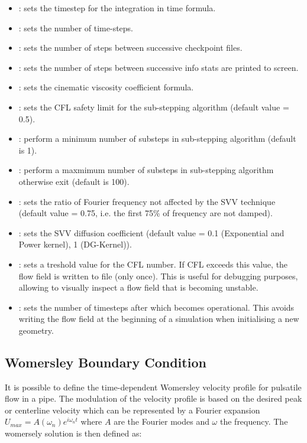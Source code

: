 \begin{itemize}
\item {}: sets the timestep for the integration in time formula.
\item {}: sets the number of time-steps.
\item {}: sets the number of steps between successive checkpoint files.
\item {}: sets the number of steps between successive info stats are printed to screen.
\item {}: sets the cinematic viscosity coefficient formula.
\item {}: sets the CFL safety limit for the sub-stepping algorithm (default value = 0.5).
\item {}: perform a minimum number of substeps in sub-stepping algorithm (default is 1).
\item {}: perform a maxmimum  number of substeps in sub-stepping algorithm otherwise exit (default is 100).
\item {}: sets the ratio of Fourier frequency not affected by the SVV technique (default value = 0.75, i.e. the first 75\% of frequency are not damped).
\item {}: sets the SVV diffusion coefficient (default value = 0.1 (Exponential and Power kernel), 1 (DG-Kernel)).
\item {}: sets a treshold value for the CFL number. If CFL exceeds this value, the flow field is written to file (only once). This is useful for debugging purposes, allowing to visually inspect a flow field that is becoming unstable.
\item {}: sets the number of timesteps after which  becomes operational. This avoids writing the flow field at the beginning of a simulation when initialising a new geometry.
\end{itemize}

\subsection{Womersley Boundary Condition}

It is possible to define the time-dependent Womersley velocity profile
for pulsatile flow in a pipe. The modulation of the velocity profile
is based on the desired peak or centerline velocity which can be
represented by a Fourier expansion $U_{max}=A(\omega_n)e^{i\omega_n
  t}$ where $A$ are the Fourier modes and $\omega $ the frequency. The
womersely solution is then defined as:

